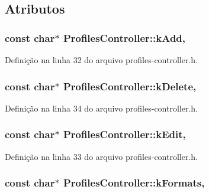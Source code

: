 \subsection{Atributos}
\subsubsection[{k\+Add}]{\setlength{\rightskip}{0pt plus 5cm}const char$\ast$ Profiles\+Controller\+::k\+Add\hspace{0.3cm}{\ttfamily [static]}, {\ttfamily [protected]}}\label{class_profiles_controller_a14a75a5ab47b6798224c99de699dfe8c}


Definição na linha 32 do arquivo profiles-\/controller.\+h.

\subsubsection[{k\+Delete}]{\setlength{\rightskip}{0pt plus 5cm}const char$\ast$ Profiles\+Controller\+::k\+Delete\hspace{0.3cm}{\ttfamily [static]}, {\ttfamily [protected]}}\label{class_profiles_controller_adc56fb023ee2d820a40064428a1d9cfa}


Definição na linha 34 do arquivo profiles-\/controller.\+h.

\subsubsection[{k\+Edit}]{\setlength{\rightskip}{0pt plus 5cm}const char$\ast$ Profiles\+Controller\+::k\+Edit\hspace{0.3cm}{\ttfamily [static]}, {\ttfamily [protected]}}\label{class_profiles_controller_a5321eb88cc8a8c7936cbb95c1a4f1cb2}


Definição na linha 33 do arquivo profiles-\/controller.\+h.

\subsubsection[{k\+Formats}]{\setlength{\rightskip}{0pt plus 5cm}const char$\ast$ Profiles\+Controller\+::k\+Formats\hspace{0.3cm}{\ttfamily [static]}, {\ttfamily [protected]}}\label{class_profiles_controller_af367c539614ca0acd25f30f38b35edd0}


